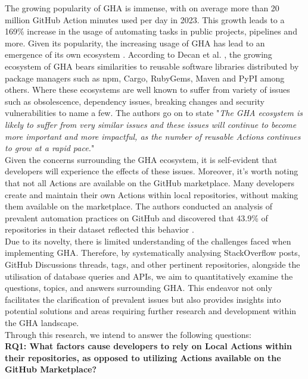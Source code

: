 \documentclass[conference]{IEEEtran}
\begin{document}
    The growing popularity of GHA is immense, with on average more than 20 million GitHub Action minutes used per day in 2023. This growth leads to a 169\% increase in the usage of automating tasks in public projects,  pipelines and more\cite{github2023octoverse}. Given its popularity,  the increasing usage of GHA has lead to an emergence of its own ecosystem \cite{decan2022use}.  According to Decan et al. \cite{decan2022use}, the growing ecosystem of GHA bears similarities to reusable software libraries distributed by package managers such as npm, Cargo, RubyGems, Maven and PyPI among others. Where these ecosystems are well known to suffer from variety of issues such as obsolescence, dependency issues, breaking changes and security vulnerabilities to name a few\cite{decan2022use}. The authors go on to state "\textit{The GHA ecosystem is likely to suffer from very similar issues and these issues will continue to become more important and more impactful, as the number of reusable Actions continues to grow at a rapid pace.}"\\

    Given the concerns surrounding the GHA ecosystem, it is self-evident that developers will experience the effects of these issues.  Moreover, it's worth noting that not all Actions are available on the GitHub marketplace. Many developers create and maintain their own Actions within local repositories, without making them available on the marketplace. The authors  conducted an analysis of prevalent automation practices on GitHub and discovered that 43.9\% of repositories in their dataset reflected this behavior \cite{decan2022use}.\\

    Due to its novelty, there is limited understanding of the challenges faced when implementing GHA.  
    Therefore,  by systematically analysing StackOverflow posts, GitHub Discussions threads, tags, and other pertinent repositories, alongside the utilisation of database queries and APIs, we aim to quantitatively examine the questions, topics, and answers surrounding GHA. This endeavor not only facilitates the clarification of prevalent issues but also provides insights into potential solutions and areas requiring further research and development within the GHA landscape.\\

    Through this research, we intend to answer the following questions:\\


    \textbf{RQ1: What factors cause developers to rely on Local Actions within their repositories, as opposed to utilizing Actions available on the GitHub Marketplace?}\\
\end{document}
